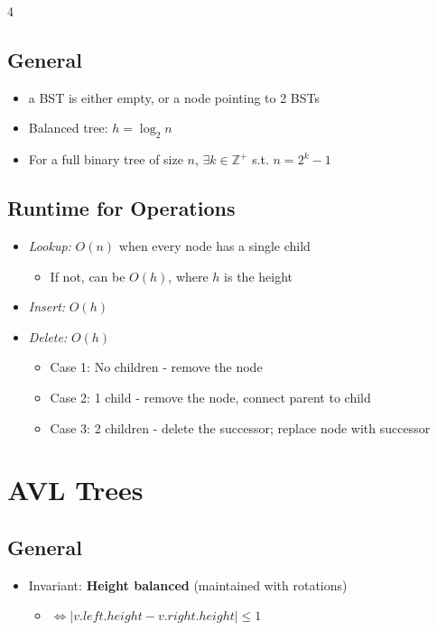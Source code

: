 \documentclass[fontsize=6pt, landscape, a4paper]{scrartcl}
\begin{document}
\begin{multicols*}{4}
    \subsection*{General}
    \begin{itemize}
        \item a BST is either empty, or a node pointing to 2 BSTs
        \item Balanced tree: $h = \log_{2} n$
        \item For a full binary tree of size $n$, $\exists k \in \mathbb{Z}^{+}$ s.t. $n =
                  2^{k} -1$
    \end{itemize}

    \subsection*{Runtime for Operations}
    \begin{itemize}
        \item \textit{Lookup:} $O(n)$ when every node has a single child
              \begin{itemize}
                  \item If not, can be $O(h)$, where $h$ is the height
              \end{itemize}
        \item \textit{Insert:} $O(h)$
        \item \textit{Delete:} $O(h)$
              \begin{itemize}
                  \item Case 1: No children - remove the node
                  \item Case 2: 1 child - remove the node, connect parent to child
                  \item Case 3: 2 children - delete the successor; replace node with successor
              \end{itemize}
    \end{itemize}

    \section*{AVL Trees}
    \subsection*{General}
    \begin{itemize}
        \item Invariant: \textbf{Height balanced} (maintained with rotations)
              \begin{itemize}
                  \item $\Leftrightarrow |v.left.height - v.right.height| \leq 1$
              \end{itemize}
    \end{itemize}

\end{multicols*}
\end{document}
